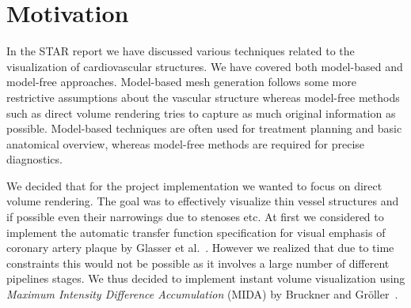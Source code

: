 \section{Motivation}

In the STAR report we have discussed various techniques related to the visualization of cardiovascular structures. We have covered both model-based and model-free approaches. Model-based mesh generation follows some more restrictive assumptions about the vascular structure whereas model-free methods such as direct volume rendering tries to capture as much original information as possible. Model-based techniques are often used for treatment planning and basic anatomical overview, whereas model-free methods are required for precise diagnostics.

We decided that for the project implementation we wanted to focus on direct volume rendering. The goal was to effectively visualize thin vessel structures and if possible even their narrowings due to stenoses etc. At first we considered to implement the automatic transfer function specification for visual emphasis of coronary artery plaque by Glasser et al.~\cite{glasser2010automatic}. However we realized that due to time constraints this would not be possible as it involves a large number of different pipelines stages. We thus decided to implement instant volume visualization using \emph{Maximum Intensity Difference Accumulation} (MIDA) by Bruckner and Gr{\"o}ller~\cite{bruckner2009instant}.


